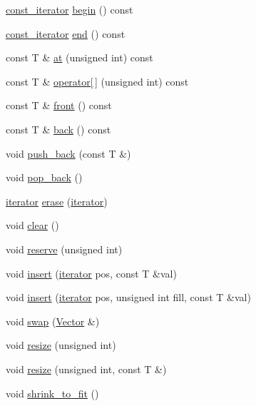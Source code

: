 \begin{DoxyCompactItemize}
\hyperlink{classVector_1_1const__iterator}{const\+\_\+iterator} \hyperlink{classVector_af8559abeb71f43efc0fc2933b79c3901_af8559abeb71f43efc0fc2933b79c3901}{begin} () const
\item 
\hyperlink{classVector_1_1const__iterator}{const\+\_\+iterator} \hyperlink{classVector_acb239aab833edfd7bb5ccd21c02ab505_acb239aab833edfd7bb5ccd21c02ab505}{end} () const
\item 
const T \& \hyperlink{classVector_a6287b84b91705e9caf0f3f197cc7e041_a6287b84b91705e9caf0f3f197cc7e041}{at} (unsigned int) const
\item 
const T \& \hyperlink{classVector_acf16259cd87643c68adfa44a0ff44eee_acf16259cd87643c68adfa44a0ff44eee}{operator\mbox{[}$\,$\mbox{]}} (unsigned int) const
\item 
const T \& \hyperlink{classVector_ae891494a5654af2db2a00d162c50985a_ae891494a5654af2db2a00d162c50985a}{front} () const
\item 
const T \& \hyperlink{classVector_ae2094e298cbe0394557b9213942a31d1_ae2094e298cbe0394557b9213942a31d1}{back} () const
\item 
void \hyperlink{classVector_a3c2e4666a28b07791817cc9562052732_a3c2e4666a28b07791817cc9562052732}{push\+\_\+back} (const T \&)
\item 
void \hyperlink{classVector_adcba035109febbe55cba2a25f8483ba6_adcba035109febbe55cba2a25f8483ba6}{pop\+\_\+back} ()
\item 
\hyperlink{classVector_1_1iterator}{iterator} \hyperlink{classVector_a423c0d0a3a93438489f596333e43990b_a423c0d0a3a93438489f596333e43990b}{erase} (\hyperlink{classVector_1_1iterator}{iterator})
\item 
void \hyperlink{classVector_a32ad98b135472b0ebc5d6cb3ae5d0085_a32ad98b135472b0ebc5d6cb3ae5d0085}{clear} ()
\item 
void \hyperlink{classVector_af3615fa3557b68d0e65f8c5519d51a8d_af3615fa3557b68d0e65f8c5519d51a8d}{reserve} (unsigned int)
\item 
void \hyperlink{classVector_addc1810308998ea4ecb85157edf8f023_addc1810308998ea4ecb85157edf8f023}{insert} (\hyperlink{classVector_1_1iterator}{iterator} pos, const T \&val)
\item 
void \hyperlink{classVector_ae4295ecbebe91ddef92c0e0d67f5be68_ae4295ecbebe91ddef92c0e0d67f5be68}{insert} (\hyperlink{classVector_1_1iterator}{iterator} pos, unsigned int fill, const T \&val)
\item 
void \hyperlink{classVector_a8000ae0fa6fb99c008b04fa7b07e40a1_a8000ae0fa6fb99c008b04fa7b07e40a1}{swap} (\hyperlink{classVector}{Vector} \&)
\item 
void \hyperlink{classVector_a2a6df7ae78537f9b0fe01ab7fc7cf442_a2a6df7ae78537f9b0fe01ab7fc7cf442}{resize} (unsigned int)
\item 
void \hyperlink{classVector_a76d7357d2ea8d1efc8de81b5e9efb95b_a76d7357d2ea8d1efc8de81b5e9efb95b}{resize} (unsigned int, const T \&)
\item 
void \hyperlink{classVector_ad6454ce193263b8000d4c18cb0c3a0c8_ad6454ce193263b8000d4c18cb0c3a0c8}{shrink\+\_\+to\+\_\+fit} ()
\end{DoxyCompactItemize}
